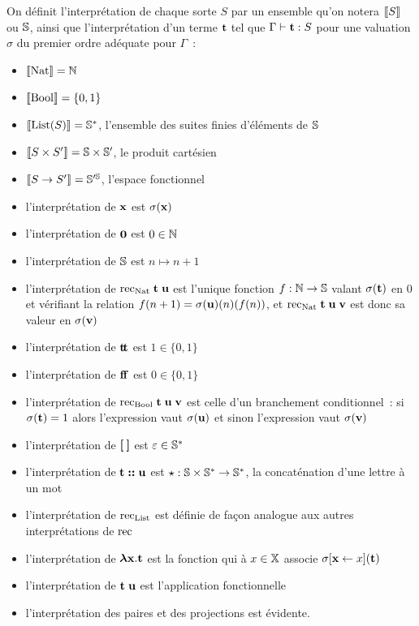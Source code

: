 \documentclass{article}
\begin{document}
On définit l'interprétation de chaque sorte $S$ par un ensemble qu'on notera $\llbracket S \rrbracket$ ou $\mathbb{S}$, ainsi que l'interprétation d'un terme $\mathbf{t}$ tel que $\Gamma\vdash \mathbf{t} : S$ pour une valuation $\sigma$ du premier ordre adéquate pour $\Gamma$~:
\begin{itemize}
    \item $\llbracket \mathrm{Nat} \rrbracket = \mathbb{N}$
    \item $\llbracket \mathrm{Bool} \rrbracket = \{0,1\}$
    \item $\llbracket \mathrm{List}(S) \rrbracket = \mathbb{S}^*$, l'ensemble des suites finies d'éléments de $\mathbb{S}$
    \item $\llbracket S\times S' \rrbracket = \mathbb{S}\times \mathbb{S}'$, le produit cartésien
    \item $\llbracket S\to S' \rrbracket = \mathbb{S}'^{\mathbb{S}}$, l'espace fonctionnel
    \item l'interprétation de $\mathbf{x}$ est $\sigma(\mathbf{x})$
    \item l'interprétation de $\boldsymbol 0$ est $0\in \mathbb{N}$
    \item l'interprétation de $\mathbb{S}$ est $n\mapsto n + 1$
    \item l'interprétation de $\mathrm{rec}_{\mathrm{Nat}}\;\mathbf{t}\;\mathbf{u}$ est l'unique fonction $f : \mathbb{N} \to \mathbb{S}$ valant $\sigma(\mathbf{t})$ en $0$ et vérifiant la relation $f(n+1) = \sigma(\mathbf{u})(n)(f(n))$, et $\mathrm{rec}_{\mathrm{Nat}}\;\mathbf{t}\;\mathbf{u}\;\mathbf{v}$ est donc sa valeur en $\sigma(\mathbf{v})$
    \item l'interprétation de $\mathbf{t}\!\mathbf{t}$ est $1\in \{0,1\}$
    \item l'interprétation de $\mathbf{f}\!\mathbf{f}$ est $0\in\{0,1\}$
    \item l'interprétation de $\mathrm{rec}_{\mathrm{Bool}}\;\mathbf{t}\;\mathbf{u}\;\mathbf{v}$ est celle d'un branchement conditionnel~: si $\sigma(\mathbf{t}) = 1$ alors l'expression vaut $\sigma(\mathbf{u})$ et sinon l'expression vaut $\sigma(\mathbf{v})$
    \item l'interprétation de $\boldsymbol{ [ }\:\boldsymbol{ ] }$ est $\varepsilon \in \mathbb{S}^*$
    \item l'interprétation de $\mathbf{t}\boldsymbol{:}\boldsymbol{:}\mathbf{u}$ est $\star : \mathbb{S} \times \mathbb{S}^* \to \mathbb{S}^*$, la concaténation d'une lettre à un mot
    \item l'interprétation de $\mathrm{rec}_{\mathrm{List}}$ est définie de façon analogue aux autres interprétations de $\mathrm{rec}$
    \item l'interprétation de $\boldsymbol{\lambda} \mathbf{x}.\mathbf{t}$ est la fonction qui à $x \in \mathbb X$ associe $\sigma[\mathbf{x}\leftarrow x](\mathbf{t})$
    \item l'interprétation de $\mathbf{t}\;\mathbf{u}$ est l'application fonctionnelle
    \item l'interprétation des paires et des projections est évidente.
\end{itemize}
\end{document}
